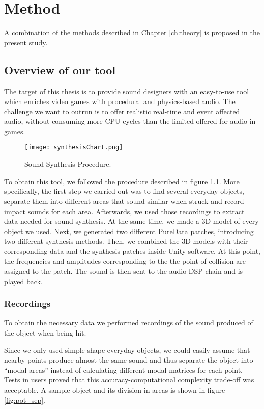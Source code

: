 \chapter{Method}\label{ch:method}

A combination of the methods described in Chapter \ref{ch:theory} is proposed in the present study.

\section{Overview of our tool}
The target of this thesis is to provide sound designers with an easy-to-use tool which enriches video games with procedural and physics-based audio. The challenge we want to outrun is to offer realistic real-time and event affected audio, without consuming more CPU cycles than the limited offered for audio in games.

\begin{figure}[H]
  \centering
    \texttt{[image: synthesisChart.png]}
      \caption{Sound Synthesis Procedure.}
      \label{fig:synth_proc}
\end{figure}

To obtain this tool, we followed the procedure described in figure \ref{fig:synth_proc}. More specifically, the first step we carried out was to find several everyday objects, separate them into different areas that sound similar when struck and record impact sounds for each area. Afterwards, we used those recordings to extract data needed for sound synthesis. At the same time, we made a 3D model of every object we used. Next, we generated two different PureData patches, introducing two different synthesis methods. Then, we combined the 3D models with their corresponding data and the synthesis patches inside Unity\textsuperscript{\textregistered} software. At this point, the frequencies and amplitudes corresponding to the  the point of collision are assigned to the patch. The sound is then sent to the audio DSP chain and is played back. 

\subsection{Recordings}
To obtain the necessary data we performed recordings of the sound produced of the object when being hit. 

Since we only used simple shape everyday objects, we could easily assume that nearby points produce almost the same sound and thus separate the object into ``modal areas'' instead of calculating different modal matrices for each point. Tests in users proved that this accuracy-computational complexity trade-off was acceptable. A sample object and its division in areas is shown in figure \ref{fig:pot_sep}.


